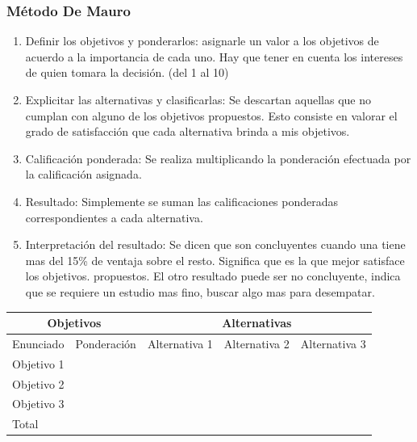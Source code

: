 \documentclass[titlepage,a4paper]{article}
\begin{document}
\subsubsection*{Método De Mauro}
\begin{enumerate}
    \item Definir los objetivos y ponderarlos: asignarle un valor a los objetivos de acuerdo a la importancia de cada uno. Hay que tener en cuenta los intereses de quien tomara la decisión. (del 1 al 10)
    \item Explicitar las alternativas y clasificarlas: Se descartan aquellas que no cumplan con alguno de los objetivos propuestos. Esto consiste en valorar el grado de satisfacción que cada alternativa brinda a mis objetivos.
    \item Calificación ponderada: Se realiza multiplicando la ponderación efectuada por la calificación asignada.
    \item Resultado: Simplemente se suman las calificaciones ponderadas correspondientes a cada alternativa.
    \item Interpretación del resultado: Se dicen que son concluyentes cuando una tiene mas del 15\% de ventaja sobre el resto. Significa que es la que mejor satisface los objetivos. propuestos. El otro resultado puede ser no concluyente, indica que se requiere un estudio mas fino, buscar algo mas para desempatar.
\end{enumerate}

\begin{table}[!htb]
\begin{tabular}{|l|l|l|l|l|l|l|l|}
\hline
\multicolumn{2}{|c|}{Objetivos} & \multicolumn{6}{c|}{Alternativas}                                                                            \\ \hline
Enunciado      & Ponderación    & \multicolumn{2}{r|}{Alternativa 1} & \multicolumn{2}{r|}{Alternativa 2} & \multicolumn{2}{r|}{Alternativa 3} \\ \hline
Objetivo 1     &                & \multicolumn{1}{r|}{}      &       &                  &                 &                  &                 \\ \hline
Objetivo 2     &                &                            &       &                  &                 &                  &                 \\ \hline
Objetivo 3     &                &                            &       &                  &                 &                  &                 \\ \hline
\multicolumn{2}{|l|}{Total}     &                            &       &                  &                 &                  &                 \\ \hline
\end{tabular}
\end{table}
\end{document}
